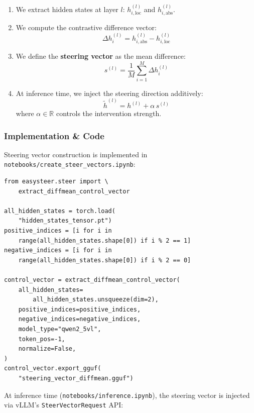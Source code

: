 \documentclass[12pt,a4paper]{article}
\begin{document}
\begin{enumerate}[leftmargin=*]
\item We extract hidden states at layer $l$: $h^{(l)}_{i,\text{loc}}$ and $h^{(l)}_{i,\text{abs}}$.
\item We compute the contrastive difference vector:
\begin{equation}
\Delta h^{(l)}_i = h^{(l)}_{i,\text{abs}} - h^{(l)}_{i,\text{loc}}
\end{equation}
\item We define the \textbf{steering vector} as the mean difference:
\begin{equation}
s^{(l)} = \frac{1}{M} \sum_{i=1}^M \Delta h^{(l)}_i
\end{equation}
\item At inference time, we inject the steering direction additively:
\begin{equation}
\tilde{h}^{(l)} = h^{(l)} + \alpha \, s^{(l)}
\end{equation}
where $\alpha \in \mathbb{R}$ controls the intervention strength.
\end{enumerate}

\subsubsection{Implementation \& Code}
Steering vector construction is implemented in \texttt{notebooks/create\_steer\_vectors.ipynb}:

\begin{lstlisting}[caption={Steering vector construction (\texttt{create\_steer\_vectors.ipynb})}]
from easysteer.steer import \
    extract_diffmean_control_vector

all_hidden_states = torch.load(
    "hidden_states_tensor.pt")
positive_indices = [i for i in
    range(all_hidden_states.shape[0]) if i % 2 == 1]
negative_indices = [i for i in
    range(all_hidden_states.shape[0]) if i % 2 == 0]

control_vector = extract_diffmean_control_vector(
    all_hidden_states=
        all_hidden_states.unsqueeze(dim=2),
    positive_indices=positive_indices,
    negative_indices=negative_indices,
    model_type="qwen2_5vl",
    token_pos=-1,
    normalize=False,
)
control_vector.export_gguf(
    "steering_vector_diffmean.gguf")
\end{lstlisting}

At inference time (\texttt{notebooks/inference.ipynb}), the steering vector is injected via vLLM's \texttt{SteerVectorRequest} API:
\end{document}
